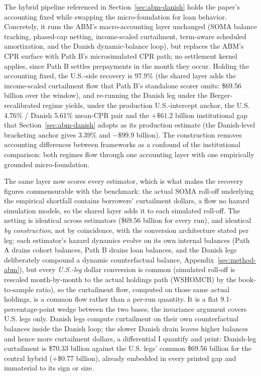 \documentclass[12pt]{article}
\begin{document}
The hybrid pipeline referenced in Section~\ref{sec:abm-danish} holds the paper's accounting fixed while swapping the micro-foundation for loan behavior. Concretely, it runs the ABM's macro-accounting layer unchanged (SOMA balance tracking, phased-cap netting, income-scaled curtailment, term-aware scheduled amortization, and the Danish dynamic-balance loop), but replaces the ABM's CPR surface with Path B's microsimulated CPR path; no settlement kernel applies, since Path B settles prepayments in the month they occur. Holding the accounting fixed, the U.S.-side recovery is 97.9\% (the shared layer adds the income-scaled curtailment flow that Path B's standalone scorer omits: \$69.56 billion over the window), and re-running the Danish leg under the Berger-recalibrated regime yields, under the production U.S.-intercept anchor, the U.S. 4.76\% / Danish 5.61\% mean-CPR pair and the $+\$61.2$ billion institutional gap that Section~\ref{sec:abm-danish} adopts as its production estimate (the Danish-level bracketing anchor gives 3.39\% and $-\$99.9$ billion). The construction removes accounting differences between frameworks as a confound of the institutional comparison: both regimes flow through one accounting layer with one empirically grounded micro-foundation.

The same layer now scores every estimator, which is what makes the recovery figures commensurable with the benchmark: the actual SOMA roll-off underlying the empirical shortfall contains borrowers' curtailment dollars, a flow no hazard simulation models, so the shared layer adds it to each simulated roll-off. The netting is identical across estimators (\$69.56 billion for every run), and identical \emph{by construction}, not by coincidence, with the conversion architecture stated per leg: each estimator's hazard dynamics evolve on its own internal balances (Path A drains cohort balances, Path B drains loan balances, and the Danish legs deliberately compound a dynamic counterfactual balance, Appendix~\ref{sec:method-abm}), but every \emph{U.S.-leg} dollar conversion is common (simulated roll-off is rescaled month-by-month to the actual holdings path (WSHOMCB) by the book-to-sample ratio), so the curtailment flow, computed on those same actual holdings, is a common flow rather than a per-run quantity. It is a flat 9.1-percentage-point wedge between the two bases; the invariance argument covers U.S. legs only. Danish legs compute curtailment on their own counterfactual balances inside the Danish loop; the slower Danish drain leaves higher balances and hence more curtailment dollars, a differential I quantify and print: Danish-leg curtailment is \$70.33 billion against the U.S. legs' common \$69.56 billion for the central hybrid (+\$0.77 billion), already embedded in every printed gap and immaterial to its sign or size.
\end{document}
